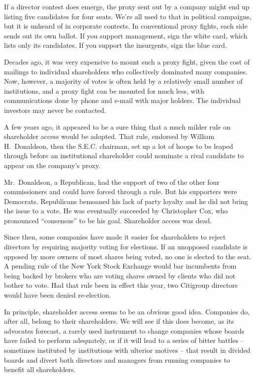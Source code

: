 \documentclass[12pt,a4paper,onecolumn]{article}
\begin{document}
If a director contest does emerge, the proxy sent out by a company might end up listing five
candidates for four seats. We're all used to that in political campaigns, but it is unheard of in
corporate contests. In conventional proxy fights, each side sends out its own ballot. If you support
management, sign the white card, which lists only its candidates. If you support the insurgents,
sign the blue card.

Decades ago, it was very expensive to mount such a proxy fight, given the cost of mailings to
individual shareholders who collectively dominated many companies. Now, however, a majority of votes
is often held by a relatively small number of institutions, and a proxy fight can be mounted for
much less, with communications done by phone and e-mail with major holders. The individual investors
may never be contacted.

A few years ago, it appeared to be a sure thing that a much milder rule on shareholder access would
be adopted. That rule, endorsed by William H.~Donaldson, then the S.E.C. chairman, set up a lot of
hoops to be leaped through before an institutional shareholder could nominate a rival candidate to
appear on the company's proxy.

Mr.~Donaldson, a Republican, had the support of two of the other four commissioners and could have
forced through a rule. But his supporters were Democrats. Republicans bemoaned his lack of party
loyalty and he did not bring the issue to a vote. He was eventually succeeded by Christopher Cox,
who pronounced ``consensus'' to be his goal. Shareholder access was dead.

Since then, some companies have made it easier for shareholders to reject directors by requiring
majority voting for elections. If an unopposed candidate is opposed by more owners of most shares
being voted, no one is elected to the seat. A pending rule of the New York Stock Exchange would bar
incumbents from being backed by brokers who are voting shares owned by clients who did not bother to
vote. Had that rule been in effect this year, two Citigroup directors would have been denied
re-election.

In principle, shareholder access seems to be an obvious good idea. Companies do, after all, belong
to their shareholders. We will see if this does become, as its advocates forecast, a rarely used
instrument to change companies whose boards have failed to perform adequately, or if it will lead to
a series of bitter battles -- sometimes instituted by institutions with ulterior motives -- that result in divided boards and divert both directors and managers from running companies to benefit all shareholders.
\end{document}
